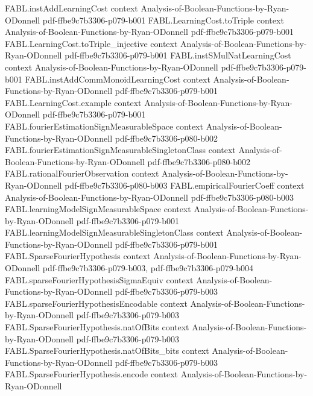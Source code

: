 \begin{theorem}
\proofstep
  {FABL.instAddLearningCost}
  {context}
  {Analysis-of-Boolean-Functions-by-Ryan-ODonnell}
  {pdf-ffbe9c7b3306-p079-b001}
\proofstep
  {FABL.LearningCost.toTriple}
  {context}
  {Analysis-of-Boolean-Functions-by-Ryan-ODonnell}
  {pdf-ffbe9c7b3306-p079-b001}
\proofstep
  {FABL.LearningCost.toTriple_injective}
  {context}
  {Analysis-of-Boolean-Functions-by-Ryan-ODonnell}
  {pdf-ffbe9c7b3306-p079-b001}
\proofstep
  {FABL.instSMulNatLearningCost}
  {context}
  {Analysis-of-Boolean-Functions-by-Ryan-ODonnell}
  {pdf-ffbe9c7b3306-p079-b001}
\proofstep
  {FABL.instAddCommMonoidLearningCost}
  {context}
  {Analysis-of-Boolean-Functions-by-Ryan-ODonnell}
  {pdf-ffbe9c7b3306-p079-b001}
\proofstep
  {FABL.LearningCost.example}
  {context}
  {Analysis-of-Boolean-Functions-by-Ryan-ODonnell}
  {pdf-ffbe9c7b3306-p079-b001}
\proofstep
  {FABL.fourierEstimationSignMeasurableSpace}
  {context}
  {Analysis-of-Boolean-Functions-by-Ryan-ODonnell}
  {pdf-ffbe9c7b3306-p080-b002}
\proofstep
  {FABL.fourierEstimationSignMeasurableSingletonClass}
  {context}
  {Analysis-of-Boolean-Functions-by-Ryan-ODonnell}
  {pdf-ffbe9c7b3306-p080-b002}
\proofstep
  {FABL.rationalFourierObservation}
  {context}
  {Analysis-of-Boolean-Functions-by-Ryan-ODonnell}
  {pdf-ffbe9c7b3306-p080-b003}
\proofstep
  {FABL.empiricalFourierCoeff}
  {context}
  {Analysis-of-Boolean-Functions-by-Ryan-ODonnell}
  {pdf-ffbe9c7b3306-p080-b003}
\proofstep
  {FABL.learningModelSignMeasurableSpace}
  {context}
  {Analysis-of-Boolean-Functions-by-Ryan-ODonnell}
  {pdf-ffbe9c7b3306-p079-b001}
\proofstep
  {FABL.learningModelSignMeasurableSingletonClass}
  {context}
  {Analysis-of-Boolean-Functions-by-Ryan-ODonnell}
  {pdf-ffbe9c7b3306-p079-b001}
\proofstep
  {FABL.SparseFourierHypothesis}
  {context}
  {Analysis-of-Boolean-Functions-by-Ryan-ODonnell}
  {pdf-ffbe9c7b3306-p079-b003,
    pdf-ffbe9c7b3306-p079-b004}
\proofstep
  {FABL.sparseFourierHypothesisSigmaEquiv}
  {context}
  {Analysis-of-Boolean-Functions-by-Ryan-ODonnell}
  {pdf-ffbe9c7b3306-p079-b003}
\proofstep
  {FABL.sparseFourierHypothesisEncodable}
  {context}
  {Analysis-of-Boolean-Functions-by-Ryan-ODonnell}
  {pdf-ffbe9c7b3306-p079-b003}
\proofstep
  {FABL.SparseFourierHypothesis.natOfBits}
  {context}
  {Analysis-of-Boolean-Functions-by-Ryan-ODonnell}
  {pdf-ffbe9c7b3306-p079-b003}
\proofstep
  {FABL.SparseFourierHypothesis.natOfBits_bits}
  {context}
  {Analysis-of-Boolean-Functions-by-Ryan-ODonnell}
  {pdf-ffbe9c7b3306-p079-b003}
\proofstep
  {FABL.SparseFourierHypothesis.encode}
  {context}
  {Analysis-of-Boolean-Functions-by-Ryan-ODonnell}

\end{theorem}
